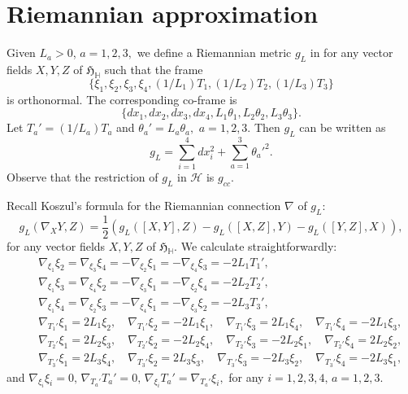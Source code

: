 \documentclass [12pt,a4paper]{amsart}
\newcommand{\calH}{\mathcal{H}}
\newcommand{\mH}{\mathbb{H}}
\newcommand{\frakH}{\mathfrak{H}}
\newcommand{\na}{\nabla}
\theoremstyle{plain}
\theoremstyle{definition}
\numberwithin{equation}{section}
\begin{document}
\section{Riemannian approximation}\label{sec:app}
Given $L_a>0$, $a=1,2,3,$  we define a Riemannian metric $g_L$ in for any vector fields $X,Y,Z$ of $\frakH_{\mH}$ such that the frame
$$
\{\xi_1,\xi_2,\xi_3,\xi_4, (1/L_1)T_1, (1/L_2)T_2,(1/L_3)T_3\}
$$
is orthonormal. The corresponding co-frame is
$$
\{dx_1,dx_2,dx_3,dx_4, L_1\theta_1,L_2\theta_2,L_3\theta_3\}.
$$
Let $T_a'=({1}/{L_a})T_a$ and $\theta_a'=L_a\theta_a,$ $a=1, 2, 3.$ 
 Then $g_L$ can be written as
$$g_L=\sum_{i=1}^4 dx_i^2+{\sum_{a=1}^{3}\theta_a'^2}.$$
Observe that the restriction of $g_L$ in $\calH$ is $g_{cc}$.

Recall Koszul's formula for the Riemannian connection $\nabla$ of $g_L$:
$$
g_L(\na_XY, Z)=\frac{1}{2}\left(g_L([X, Y], Z)-g_L([X,Z], Y)-g_L([Y, Z], X)\right),
$$
for any vector fields $X,Y,Z$ of $\frakH_{\mH}$.
We calculate straightforwardly:
\begin{eqnarray*}
&&  \na_{\xi_1} \xi_2 =\na_{\xi_3} \xi_4 =- \na_{\xi_2} \xi_1=- \na_{\xi_4} \xi_3=-2L_1T_1',\\
&& \na_{\xi_1} \xi_3 =\na_{\xi_4} \xi_2=- \na_{\xi_3} \xi_1=-\na_{\xi_2} \xi_4 =-2L_2T_2',\\
&& \na_{\xi_1} \xi_4 = \na_{\xi_2} \xi_3 =- \na_{\xi_4} \xi_1=- \na_{\xi_3} \xi_2=-2L_3T_3',\\
&& \na_{T_1'} \xi_1=2L_1\xi_2,\quad \na_{T_1'} \xi_2=-2L_1\xi_1,\quad  \na_{T_1'} \xi_3=2L_1\xi_4,\quad  \na_{T_1'} \xi_4=-2L_1\xi_3,\\
&& \na_{T_2'} \xi_1=2L_2\xi_3,\quad \na_{T_2'} \xi_2=-2L_2\xi_4,\quad  \na_{T_2'} \xi_3=-2L_2\xi_1,\quad  \na_{T_2'} \xi_4=2L_2\xi_2,\\
&& \na_{T_3'} \xi_1=2L_3\xi_4,\quad \na_{T_3'} \xi_2=2L_3\xi_3,\quad  \na_{T_3'} \xi_3=-2L_3\xi_2,\quad  \na_{T_3'} \xi_4=-2L_3\xi_1,
\end{eqnarray*}
and $ \na_{\xi_i} \xi_i =0,\, \na_{T_a'} T_a '=0,\, \na_{\xi_i} T_a'= \na_{T_a'} \xi_i ,$ for any $ i=1, 2, 3, 4,\, a=1, 2, 3.$
\end{document}
